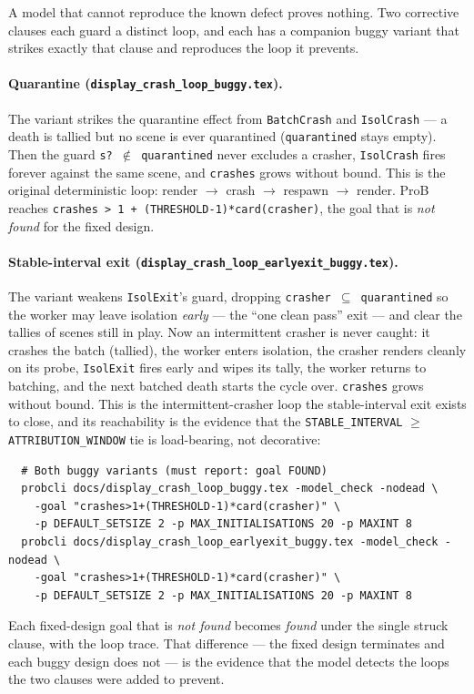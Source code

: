 \documentclass[a4paper,10pt,fleqn]{article}
\begin{document}
A model that cannot reproduce the known defect proves nothing.  Two corrective
clauses each guard a distinct loop, and each has a companion buggy variant that
strikes exactly that clause and reproduces the loop it prevents.

\paragraph{Quarantine (\texttt{display\_crash\_loop\_buggy.tex}).}
The variant strikes the quarantine effect from \texttt{BatchCrash} and
\texttt{IsolCrash} --- a death is tallied but no scene is ever quarantined
(\texttt{quarantined} stays empty).  Then the guard \texttt{s? $\notin$
quarantined} never excludes a crasher, \texttt{IsolCrash} fires forever against
the same scene, and \texttt{crashes} grows without bound.  This is the original
deterministic loop: render $\to$ crash $\to$ respawn $\to$ render.  ProB reaches
\texttt{crashes > 1 + (THRESHOLD-1)*card(crasher)}, the goal that is \emph{not
found} for the fixed design.

\paragraph{Stable-interval exit
(\texttt{display\_crash\_loop\_earlyexit\_buggy.tex}).}
The variant weakens \texttt{IsolExit}'s guard, dropping \texttt{crasher $\subseteq$
quarantined} so the worker may leave isolation \emph{early} --- the ``one clean
pass'' exit --- and clear the tallies of scenes still in play.  Now an intermittent
crasher is never caught: it crashes the batch (tallied), the worker enters
isolation, the crasher renders cleanly on its probe, \texttt{IsolExit} fires early
and wipes its tally, the worker returns to batching, and the next batched death
starts the cycle over.  \texttt{crashes} grows without bound.  This is the
intermittent-crasher loop the stable-interval exit exists to close, and its
reachability is the evidence that the \texttt{STABLE\_INTERVAL} $\geq$
\texttt{ATTRIBUTION\_WINDOW} tie is load-bearing, not decorative:
\begin{verbatim}
  # Both buggy variants (must report: goal FOUND)
  probcli docs/display_crash_loop_buggy.tex -model_check -nodead \
    -goal "crashes>1+(THRESHOLD-1)*card(crasher)" \
    -p DEFAULT_SETSIZE 2 -p MAX_INITIALISATIONS 20 -p MAXINT 8
  probcli docs/display_crash_loop_earlyexit_buggy.tex -model_check -nodead \
    -goal "crashes>1+(THRESHOLD-1)*card(crasher)" \
    -p DEFAULT_SETSIZE 2 -p MAX_INITIALISATIONS 20 -p MAXINT 8
\end{verbatim}

Each fixed-design goal that is \emph{not found} becomes \emph{found} under the
single struck clause, with the loop trace.  That difference --- the fixed design
terminates and each buggy design does not --- is the evidence that the model
detects the loops the two clauses were added to prevent.
\end{document}
